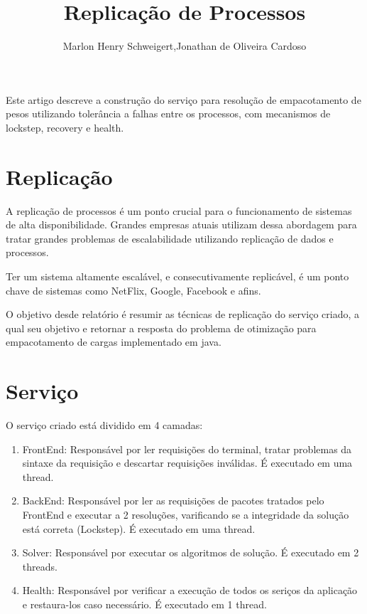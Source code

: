 \documentclass[12pt]{article}
\title{Replicação de Processos}
\author{Marlon Henry Schweigert\inst{1},Jonathan de Oliveira Cardoso\inst{1}}
\begin{document}
 

\maketitle
     
\begin{resumo} 
  Este artigo descreve a construção do serviço para resolução de empacotamento de pesos utilizando tolerância a falhas entre os processos, com mecanismos de lockstep, recovery e health.
\end{resumo}


\section{Replicação}

A replicação de processos é um ponto crucial para o funcionamento de sistemas de alta disponibilidade. Grandes empresas atuais utilizam dessa abordagem para tratar grandes problemas de escalabilidade utilizando replicação de dados e processos.

Ter um sistema altamente escalável, e consecutivamente replicável, é um ponto chave de sistemas como NetFlix, Google, Facebook e afins.

O objetivo desde relatório é resumir as técnicas de replicação do serviço criado, a qual seu objetivo e retornar a resposta do problema de otimização para empacotamento de cargas implementado em java\cite{java}.

\section{Serviço}

O serviço criado está dividido em 4 camadas:

\begin{enumerate}
    \item FrontEnd: Responsável por ler requisições do terminal, tratar problemas da sintaxe da requisição e descartar requisições inválidas. É executado em uma thread.
    \item BackEnd: Responsável por ler as requisições de pacotes tratados pelo FrontEnd e executar a 2 resoluções, varificando se a integridade da solução está correta (Lockstep). É executado em uma thread.
    \item Solver: Responsável por executar os algoritmos de solução. É executado em 2 threads.
    \item Health: Responsável por verificar a execução de todos os seriços da aplicação e restaura-los caso necessário. É executado em 1 thread.
\end{enumerate}
\end{document}
